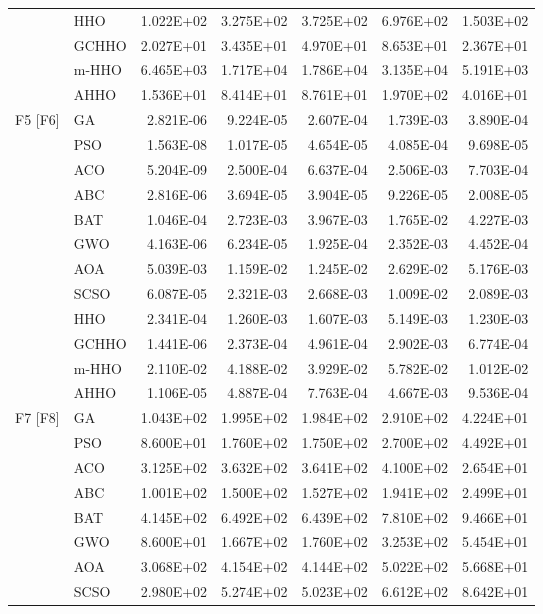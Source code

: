 \begin{longtable}{llrrrrr}
 & HHO & 1.022E+02 & 3.275E+02 & 3.725E+02 & 6.976E+02 & 1.503E+02 \\
 & GCHHO & 2.027E+01 & 3.435E+01 & 4.970E+01 & 8.653E+01 & 2.367E+01 \\
 & m-HHO & 6.465E+03 & 1.717E+04 & 1.786E+04 & 3.135E+04 & 5.191E+03 \\
 & AHHO & 1.536E+01 & 8.414E+01 & 8.761E+01 & 1.970E+02 & 4.016E+01 \\
\addlinespace
F5 [F6] & GA & 2.821E-06 & 9.224E-05 & 2.607E-04 & 1.739E-03 & 3.890E-04 \\
 & PSO & 1.563E-08 & 1.017E-05 & 4.654E-05 & 4.085E-04 & 9.698E-05 \\
 & ACO & 5.204E-09 & 2.500E-04 & 6.637E-04 & 2.506E-03 & 7.703E-04 \\
 & ABC & 2.816E-06 & 3.694E-05 & 3.904E-05 & 9.226E-05 & 2.008E-05 \\
 & BAT & 1.046E-04 & 2.723E-03 & 3.967E-03 & 1.765E-02 & 4.227E-03 \\
 & GWO & 4.163E-06 & 6.234E-05 & 1.925E-04 & 2.352E-03 & 4.452E-04 \\
 & AOA & 5.039E-03 & 1.159E-02 & 1.245E-02 & 2.629E-02 & 5.176E-03 \\
 & SCSO & 6.087E-05 & 2.321E-03 & 2.668E-03 & 1.009E-02 & 2.089E-03 \\
 & HHO & 2.341E-04 & 1.260E-03 & 1.607E-03 & 5.149E-03 & 1.230E-03 \\
 & GCHHO & 1.441E-06 & 2.373E-04 & 4.961E-04 & 2.902E-03 & 6.774E-04 \\
 & m-HHO & 2.110E-02 & 4.188E-02 & 3.929E-02 & 5.782E-02 & 1.012E-02 \\
 & AHHO & 1.106E-05 & 4.887E-04 & 7.763E-04 & 4.667E-03 & 9.536E-04 \\
\addlinespace
F7 [F8] & GA & 1.043E+02 & 1.995E+02 & 1.984E+02 & 2.910E+02 & 4.224E+01 \\
 & PSO & 8.600E+01 & 1.760E+02 & 1.750E+02 & 2.700E+02 & 4.492E+01 \\
 & ACO & 3.125E+02 & 3.632E+02 & 3.641E+02 & 4.100E+02 & 2.654E+01 \\
 & ABC & 1.001E+02 & 1.500E+02 & 1.527E+02 & 1.941E+02 & 2.499E+01 \\
 & BAT & 4.145E+02 & 6.492E+02 & 6.439E+02 & 7.810E+02 & 9.466E+01 \\
 & GWO & 8.600E+01 & 1.667E+02 & 1.760E+02 & 3.253E+02 & 5.454E+01 \\
 & AOA & 3.068E+02 & 4.154E+02 & 4.144E+02 & 5.022E+02 & 5.668E+01 \\
 & SCSO & 2.980E+02 & 5.274E+02 & 5.023E+02 & 6.612E+02 & 8.642E+01 \\

\end{longtable}
